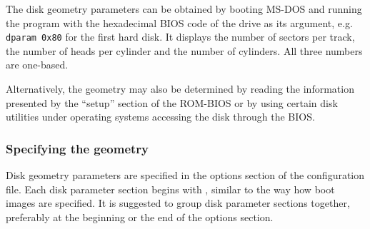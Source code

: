 The disk geometry parameters can be obtained by booting MS-DOS and
running the program  with the hexadecimal BIOS code of
the drive as its argument, e.g. \verb"dparam 0x80" for the first hard
disk. It displays the number of sectors per
track, the number of heads per cylinder and the number of cylinders.
All three numbers are one-based.

Alternatively, the geometry may also be determined by reading the information
presented by the ``setup'' section of the ROM-BIOS or by using certain disk
utilities under operating systems accessing the disk through the BIOS.


\subsubsection{Specifying the geometry}
\label{diskspec}

Disk geometry parameters are specified in the options section of the
configuration file. Each disk parameter section begins with
, similar to the way how boot images are
specified.
It is suggested to group disk parameter sections together, preferably
at the beginning or the end of the options section.

